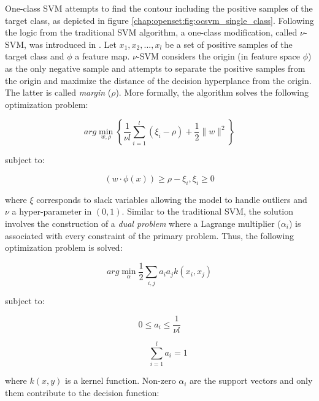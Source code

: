 One-class SVM attempts to find the contour including the positive samples of the target class, as depicted in figure \ref{chap:openset:fig:ocsvm_single_class}. Following the logic from the traditional SVM algorithm, a one-class modification, called $\nu$-SVM, was introduced in \parencite{scholkopf1999estimating}. Let $x_1, x_2,..., x_l$ be a set of positive samples of the target class and $\phi$ a feature map. $\nu$-SVM considers the origin (in feature space $\phi$) as the only negative sample and attempts to separate the positive samples from the origin and maximize the distance of the decision hyperplance from the origin. The latter is called \textit{margin} ($\rho$). More formally, the algorithm solves the following optimization problem:

\begin{equation}\label{chap:openset:sec:eq:3}
	arg\min_{w,\rho}\left\{ \frac{1}{\nu l} \sum_{i=1}^{l}(\xi_{i}-\rho)+\frac{1}{2}\|w\|^{2}\right\}
\end{equation}

\nointend subject to:

\begin{equation}
    (w \cdot \phi(x)) \geq \rho - \xi_i, \xi_i \geq 0
\end{equation}

\noindent where $\xi$ corresponds to slack variables allowing the model to handle outliers and $\nu$ a hyper-parameter in $(0,1)$. Similar to the traditional SVM, the solution involves the construction of a \textit{dual problem} where a Lagrange multiplier ($\alpha_i$) is associated with every constraint of the primary problem. Thus, the following optimization problem is solved:

\begin{equation}\label{chap:openset:sec:eq:12}
	arg\min_{\alpha}\frac{1}{2}\sum_{i,j}a_{i}a_{j}k(x_{i},x_{j})
\end{equation}

\nointent subject to:

\begin{equation}\label{chap:openset:sec:eq:4}
	0\leqslant a_{i}\leqslant \frac{1}{\nu l} %
\end{equation}

\begin{equation}\label{chap:openset:sec:eq:5}
	\qquad \sum_{i=1}^{l}a_{i}=1
\end{equation}

\nointend where $k(x,y)$ is a kernel function. Non-zero $\alpha_i$ are the support vectors and only them contribute to the decision function:

